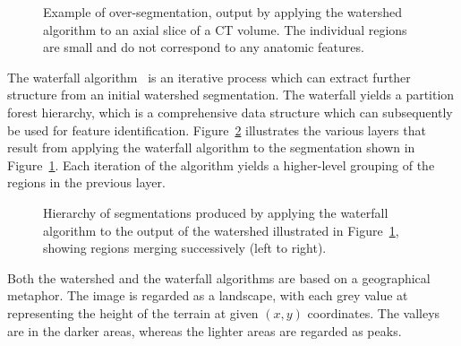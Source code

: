 \documentclass{ouclprgsc}
\begin{document}
\begin{figure}
\centering
\ifpdf
        \hspace{1mm}%
\else
\fi
\caption{Example of over-segmentation, output by applying the watershed
  algorithm to an axial slice of a CT volume. The individual regions
  are small and do not correspond to any anatomic features.}
\label{fig:oversegmented}
\end{figure}
\vspace{-5mm}
%
The waterfall algorithm~\cite{beucher94,marcotegui} is an iterative process which can extract
further structure from an initial watershed segmentation. The
waterfall yields a partition forest hierarchy, which is a
comprehensive data structure which  can subsequently be used  for
feature identification.  Figure~\ref{fig:waterfall} illustrates the
various layers that result from applying the waterfall algorithm to
the segmentation shown in Figure~\ref{fig:oversegmented}.  Each
iteration of the algorithm yields a higher-level grouping of the
regions in the previous layer.
\vspace{-5mm}
\begin{figure}
\centering
\ifpdf
        \hspace{1mm}%
        \hspace{1mm}%
\else
\fi
\caption{Hierarchy of segmentations produced by applying the waterfall
  algorithm to the output of the watershed illustrated in
  Figure~\ref{fig:oversegmented}, showing regions merging successively
  (left to right).}
\label{fig:waterfall}
\end{figure}

Both the watershed and the waterfall algorithms are based on a
geographical metaphor. The image is regarded as a landscape, with each
grey value at representing the height of the terrain at given $(x,y)$
coordinates.
%
The valleys are
in the darker areas, whereas the lighter areas are regarded as peaks.
\end{document}
